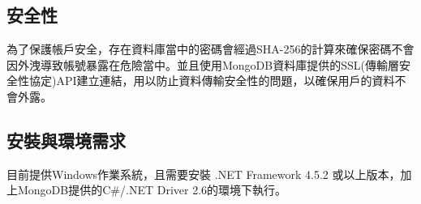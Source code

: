 \documentclass{scrreprt}
\begin{document}
\begin{CJK}{UTF8}{bkai}
\section{安全性}
\qquad 為了保護帳戶安全，存在資料庫當中的密碼會經過SHA-256的計算來確保密碼不會因外洩導致帳號暴露在危險當中。並且使用MongoDB資料庫提供的SSL(傳輸層安全性協定)API建立連結，用以防止資料傳輸安全性的問題，以確保用戶的資料不會外露。

\section{安裝與環境需求}
\qquad 目前提供Windows作業系統，且需要安裝 .NET Framework 4.5.2 或以上版本，加上MongoDB提供的C\#/.NET Driver 2.6的環境下執行。
\chapter{}
\end{CJK}
\end{document}
